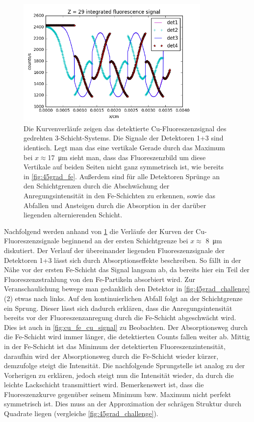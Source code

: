 \begin{figure}[H] 
  \centering
     \includegraphics[width=0.85\textwidth]{illustrations/45grad_cu.png}
  \caption[Fluoreszenzbild Kupfer \SI{45}{\degree}-Probe]{Die Kurvenverläufe zeigen das detektierte Cu-Fluoreszenzsignal des gedrehten 3-Schicht-Systems. Die Signale der Detektoren 1+3 sind identisch. Legt man das eine vertikale Gerade durch das Maximum bei $x\approx$\SI{17}{\micro\meter} sieht man, dass das Fluoreszenzbild um diese Vertikale auf beiden Seiten nicht ganz symmetrisch ist, wie bereits in \cref{fig:45grad_fe}. Außerdem sind für alle Detektoren Sprünge an den Schichtgrenzen durch die Abschwächung der Anregungsintensität in den Fe-Schichten zu erkennen, sowie das Abfallen und Ansteigen durch die Absorption in der darüber liegenden alternierenden Schicht.}
  \label{fig:45grad_cu}
\end{figure}

Nachfolgend werden anhand von \cref{fig:45grad_cu} die Verläufe der Kurven der Cu-Fluoreszenz\-signale beginnend an der ersten Schichtgrenze bei $x\approx$ \SI{8}{\micro\meter} diskutiert. Der Verlauf der übereinander liegenden Fluoreszenzsignale der Detektoren 1+3 lässt sich durch Absorptionseffekte beschreiben. So fällt in der Nähe vor der ersten Fe-Schicht das Signal langsam ab, da bereits hier ein Teil der Fluoreszenzstrahlung von den Fe-Partikeln absorbiert wird. Zur Veranschaulichung bewege man gedanklich den Detektor in \cref{fig:45grad_challenge} (2) etwas nach links. Auf den kontinuierlichen Abfall folgt an der Schichtgrenze ein Sprung. Dieser lässt sich dadurch erklären, dass die Anregungsintensität bereits vor der Fluoreszenzanregung durch die Fe-Schicht abgeschwächt wird. Dies ist auch in \cref{fig:cu_fe_cu_signal} zu Beobachten. Der Absorptionsweg durch die Fe-Schicht wird immer länger, die detektierten Counts fallen weiter ab. Mittig in der Fe-Schicht ist das Minimum der detektierten Fluoreszenzintensität, daraufhin wird der Absorptionsweg durch die Fe-Schicht wieder kürzer, demzufolge steigt die Intensität. Die nachfolgende Sprungstelle ist analog zu der Vorherigen zu erklären, jedoch steigt nun die Intensität wieder, da durch die leichte Lackschicht transmittiert wird. Bemerkenswert ist, dass die Fluoreszenzkurve gegenüber seinem Minimum bzw. Maximum nicht perfekt symmetrisch ist. Dies muss an der Approximation der schrägen Struktur durch Quadrate liegen (vergleiche \cref{fig:45grad_challenge}).\newline


